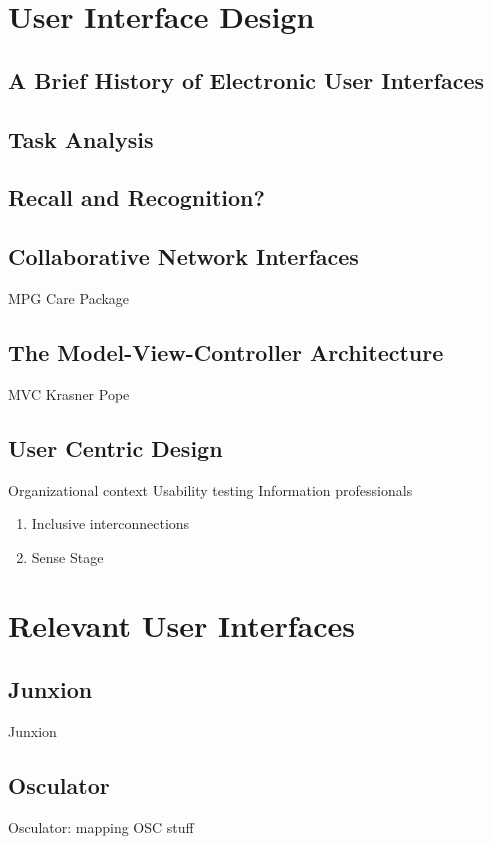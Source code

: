\section{User Interface Design}
	\subsection{A Brief History of Electronic User Interfaces}
	\subsection{Task Analysis}
	\subsection{Recall and Recognition?}
	\subsection{Collaborative Network Interfaces}
		MPG Care Package 
	\subsection{The Model-View-Controller Architecture}
		MVC Krasner Pope 
	\subsection{User Centric Design}
		Organizational context 
		Usability testing 
		Information professionals 
	\begin{enumerate}
		\item Inclusive interconnections 
		\item Sense Stage 
	\end{enumerate}

\section{Relevant User Interfaces}
	\subsection{Junxion}
		Junxion 
	\subsection{Osculator}
		Osculator: mapping OSC stuff 
